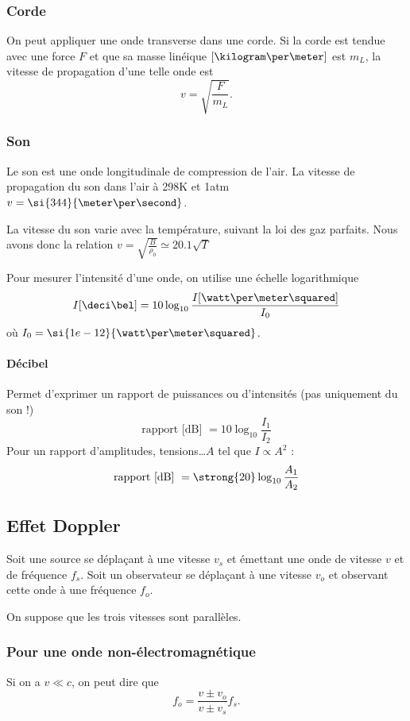 \subsubsection{Corde}
On peut appliquer une onde transverse dans une corde.
Si la corde est tendue avec une force $F$ et que
sa masse linéique $[\kilogram\per\meter]$ est $m_L$,
la vitesse de propagation d'une telle onde est
\[ v = \sqrt{\frac{F}{m_L}}. \]

\subsubsection{Son}
Le son est une onde longitudinale de compression de l'air.
La vitesse de propagation du son dans l'air à \si{298}{K} et \si{1}{atm}
$v = \si{344}{\meter\per\second}$.

La vitesse du son varie avec la température, suivant la loi des gaz parfaits.
Nous avons donc la relation $v = \sqrt{\frac{B}{\rho_0}} \simeq 20.1\sqrt{T}$

Pour mesurer l'intensité d'une onde, on utilise une échelle logarithmique
\[ I[\deci\bel] = 10 \log_{10}\frac{I[\watt\per\meter\squared]}{I_0} \]
où $I_0 = \si{1e-12}{\watt\per\meter\squared}$.

\paragraph{Décibel}

Permet d'exprimer un rapport de puissances ou d'intensités
(pas uniquement du son !)
\[\text{rapport [dB] } = 10 \log_{10}\frac{I_1}{I_2}\]
Pour un rapport d'amplitudes, tensions\dots \(A\) tel que \(I \propto A^2\) :
\[\text{rapport [dB] } = \strong{20} \log_{10}\frac{A_1}{A_2}\]

\subsection{Effet Doppler}
Soit une source se déplaçant à une vitesse $v_s$ et émettant
une onde de vitesse $v$ et de fréquence $f_s$.
Soit un observateur se déplaçant à une vitesse $v_o$ et
observant cette onde à une fréquence $f_o$.

On suppose que les trois vitesses sont parallèles.

\subsubsection{Pour une onde non-électromagnétique}
Si on a $v \ll c$, on peut dire que
\[ f_o = \frac{v \pm v_o}{v \pm v_s} f_s. \]

